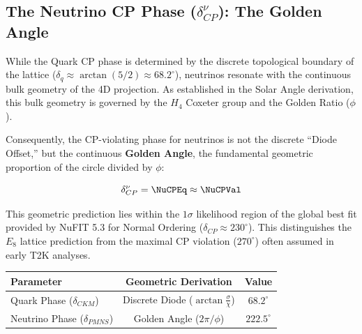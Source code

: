 
\subsection{The Neutrino CP Phase (\texorpdfstring{$\delta_{CP}^\nu$}{deltacpnu}): The Golden Angle}

While the Quark CP phase is determined by the discrete topological boundary of the lattice ($\delta_{q} \approx \arctan(5/2) \approx 68.2^{\circ}$), neutrinos resonate with the continuous bulk geometry of the 4D projection. As established in the Solar Angle derivation, this bulk geometry is governed by the $H_4$ Coxeter group and the Golden Ratio ($\phi$).

Consequently, the CP-violating phase for neutrinos is not the discrete ``Diode Offset,'' but the continuous \textbf{Golden Angle}, the fundamental geometric proportion of the circle divided by $\phi$:

\begin{equation}
\delta_{CP}^\nu = \NuCPEq \approx \NuCPVal
\label{eq:neutrino_cp}
\end{equation}

This geometric prediction lies within the $1\sigma$ likelihood region of the global best fit provided by NuFIT 5.3 for Normal Ordering ($\delta_{CP} \approx 230^{\circ}$). This distinguishes the $E_8$ lattice prediction from the maximal CP violation ($270^{\circ}$) often assumed in early T2K analyses.

\begin{center}
\begin{tabular}{l c c}
\hline
\textbf{Parameter} & \textbf{Geometric Derivation} & \textbf{Value} \\
\hline
Quark Phase ($\delta_{CKM}$) & Discrete Diode ($\arctan \frac{\sigma}{\chi}$) & $68.2^{\circ}$ \\
Neutrino Phase ($\delta_{PMNS}$) & Golden Angle ($2\pi / \phi$) & $222.5^{\circ}$ \\
\hline
\end{tabular}
\end{center}






